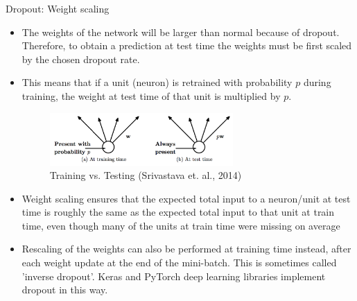 \begin{vbframe}{Dropout: Weight scaling}
  \begin{itemize}
    \item The weights of the network will be larger than normal because of dropout. Therefore, to obtain a prediction at test time the weights must be first scaled by the chosen dropout rate.
    \item This means that if a unit (neuron) is retrained with probability $p$ during training, the weight at test time of that unit is multiplied by $p$.
  \begin{figure}
      \centering
    \includegraphics[width=7cm]{figure/dropout_neuron.png}
    \caption{Training vs. Testing (Srivastava et. al., 2014)}
  \end{figure}
  \item Weight scaling ensures that the expected total input to a neuron/unit at test time is roughly the same as the expected total input to that unit at train time, even though many of the units at train time were missing on average
  \item Rescaling of the weights can also be performed at training time instead, after each weight update at the end of the mini-batch. This is sometimes called 'inverse dropout'. Keras and PyTorch deep learning libraries implement dropout in this way.
  \end{itemize}
\end{vbframe}

